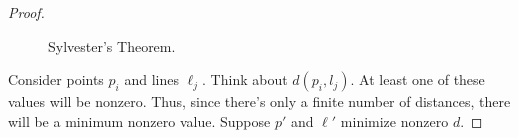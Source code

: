 \documentclass[../apprentice.tex]{subfiles}
\begin{document}
\begin{enumerate}
\begin{proof}
\begin{figure}[h!]
            \caption{Sylvester's Theorem.}
            \label{fig:SylvestersTheorem}
        \end{figure}
        Consider points $p_i$ and lines $\ell_j$. Think about $d(p_i,l_j)$. At least one of these values will be nonzero. Thus, since there's only a finite number of distances, there will be a minimum nonzero value. Suppose $p'$ and $\ell'$ minimize nonzero $d$.
    \end{proof}
\end{enumerate}
\end{document}
